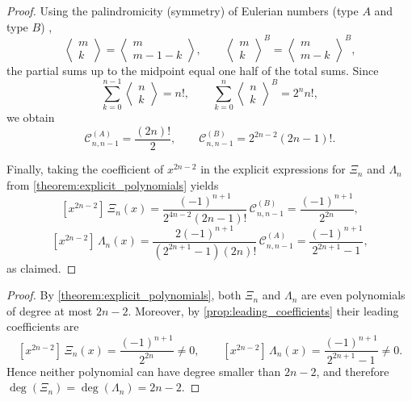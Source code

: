 \documentclass[11pt,twoside]{article}
\newtheorem{corollary}[theorem]{Corollary}
\numberwithin{equation}{section}
\begin{document}
\begin{proof}
Using the palindromicity (symmetry) of Eulerian numbers (type $A$ and type $B$) \cite{FulmanLeeKimPetersen2021},
\[
\left\langle\begin{matrix}m\\ k\end{matrix}\right\rangle
=
\left\langle\begin{matrix}m\\ m-1-k\end{matrix}\right\rangle,
\qquad
\left\langle\begin{matrix}m\\ k\end{matrix}\right\rangle^{B}
=
\left\langle\begin{matrix}m\\ m-k\end{matrix}\right\rangle^{B},
\]
the partial sums up to the midpoint equal one half of the total sums. Since
\[
\sum_{k=0}^{n-1}\left\langle\begin{matrix}n\\ k\end{matrix}\right\rangle=n!,
\qquad
\sum_{k=0}^{n}\left\langle\begin{matrix}n\\ k\end{matrix}\right\rangle^{B}=2^{n}n!,
\]
we obtain
\[
\mathcal{C}^{(A)}_{n,n-1}=\frac{(2n)!}{2},
\qquad
\mathcal{C}^{(B)}_{n,n-1}=2^{2n-2}(2n-1)!.
\]

Finally, taking the coefficient of $x^{2n-2}$ in the explicit expressions for $\Xi_n$ and $\Lambda_n$
from \cref{theorem:explicit_polynomials} yields
\[
[x^{2n-2}]\,\Xi_n(x)=\frac{(-1)^{n+1}}{2^{4n-2}(2n-1)!}\,\mathcal{C}^{(B)}_{n,n-1}
=\frac{(-1)^{n+1}}{2^{2n}},
\]
\[
[x^{2n-2}]\,\Lambda_n(x)=\frac{2(-1)^{n+1}}{(2^{2n+1}-1)(2n)!}\,\mathcal{C}^{(A)}_{n,n-1}
=\frac{(-1)^{n+1}}{2^{2n+1}-1},
\]
as claimed.
\end{proof}


\begin{proof}
By \cref{theorem:explicit_polynomials}, both $\Xi_n$ and $\Lambda_n$ are even polynomials of degree at most $2n-2$.
Moreover, by \cref{prop:leading_coefficients} their leading coefficients are
\[
[x^{2n-2}]\,\Xi_n(x)=\frac{(-1)^{n+1}}{2^{2n}}\neq 0,
\qquad
[x^{2n-2}]\,\Lambda_n(x)=\frac{(-1)^{n+1}}{2^{2n+1}-1}\neq 0.
\]
Hence neither polynomial can have degree smaller than $2n-2$, and therefore
$\deg(\Xi_n)=\deg(\Lambda_n)=2n-2$.
\end{proof}
\end{document}
